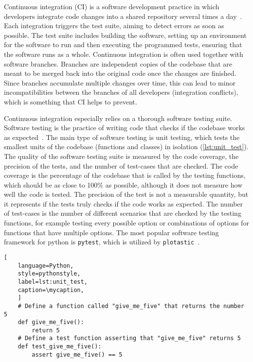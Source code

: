 Continuous integration (CI) is a software development practice in which
developers integrate code changes into a shared repository several times a
day~\cite{duvall2007continuous}. Each integration triggers the test suite,
aiming to detect errors as soon as possible. The test suite includes building
the software, setting up an environment for the software to run and then
executing the programmed tests, ensuring that the software runs as a whole.
Continuous integration is often used together with software branches. Branches
are independent copies of the codebase that are meant to be merged back into the
original code once the changes are finished. Since branches accumulate multiple
changes over time, this can lead to minor incompatibilities between the branches
of all developers (integration conflicts), which is something that CI helps to
prevent.

Continuous integration especially relies on a thorough software testing suite.
Software testing is the practice of writing code that checks if the codebase
works as expected~\cite{10.5555/2161638}. The main type of software testing is
unit testing, which tests the smallest units of the codebase (functions and
classes) in isolation (\autoref{lst:unit_test}). The quality of the software
testing suite is measured by the code coverage, the precision of the tests, and
the number of test-cases that are checked. The code coverage is the percentage
of the codebase that is called by the testing functions, which should be as
close to 100\% as possible, although it does not measure how well the code is
tested. The precision of the test is not a measurable quantity, but it
represents if the tests truly checks if the code works as expected. The number
of test-cases is the number of different scenarios that are checked by the
testing functions, for example testing every possible option or combinations of
options for functions that have multiple options. The most popular software
testing framework for python is \texttt{pytest}, which is utilized by
\texttt{plotastic}~\cite{pytestx.y}.

\def\mycaption{ Example of an arbitrary python function and its respective unit
    test function. The first function simply returns the number 5. The second
    function tests if the first function indeed returns the number 5. The test
    function is named with the prefix ``\texttt{test\_}'' and is placed in a
    file that ends with the suffix ``\texttt{\_test.py}''. The test function is
    executed by the testing framework \texttt{pytest}. Note that code after
    ``\texttt{\#}'' is considered a comment and won't be executed.}
\begin{lstlisting}[
    language=Python, 
    style=pythonstyle,
    label=lst:unit_test, 
    caption=\mycaption,
    ]
    # Define a function called "give_me_five" that returns the number 5
    def give_me_five():
        return 5
    # Define a test function asserting that "give_me_five" returns 5
    def test_give_me_five():
        assert give_me_five() == 5 
\end{lstlisting}


